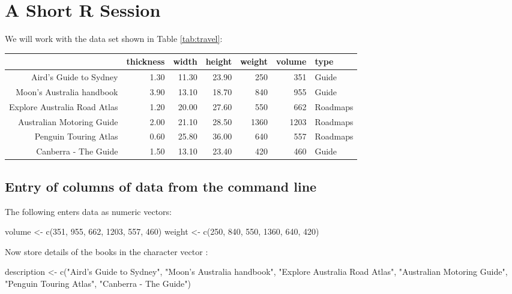 \section{A Short R Session}\label{ss:shortR}
We will work with the data set shown in Table
\ref{tab:travel}:

\begin{table*}[ht]
\centering
\begin{tabular}{rrrrrrl}
  \hline
 & thickness & width & height & weight & volume & type \\
  \hline
Aird's Guide to Sydney & 1.30 & 11.30 & 23.90 & 250 & 351 & Guide \\
  Moon's Australia handbook & 3.90 & 13.10 & 18.70 & 840 & 955 & Guide \\
  Explore Australia Road Atlas & 1.20 & 20.00 & 27.60 & 550 & 662 & Roadmaps \\
  Australian Motoring Guide & 2.00 & 21.10 & 28.50 & 1360 & 1203 & Roadmaps \\
  Penguin Touring Atlas & 0.60 & 25.80 & 36.00 & 640 & 557 & Roadmaps \\
  Canberra - The Guide & 1.50 & 13.10 & 23.40 & 420 & 460 & Guide \\
   \hline
\end{tabular}
\vspace*{15pt}

\caption{Weights and volumes, for six Australian travel
books.}\label{tab:travel}
\end{table*}

\subsection*{Entry of columns of data from the command line}
The following enters data as numeric vectors:
\begin{Schunk}
\begin{Sinput}
volume <- c(351, 955, 662, 1203, 557, 460)
weight <- c(250, 840, 550, 1360, 640, 420)
\end{Sinput}
\end{Schunk}

Now store details of the books in the character vector :
\begin{Schunk}
\begin{Sinput}
description <- c("Aird's Guide to Sydney",
 "Moon's Australia handbook",
 "Explore Australia Road Atlas",
 "Australian Motoring Guide",
 "Penguin Touring Atlas", "Canberra - The Guide")
\end{Sinput}
\end{Schunk}

